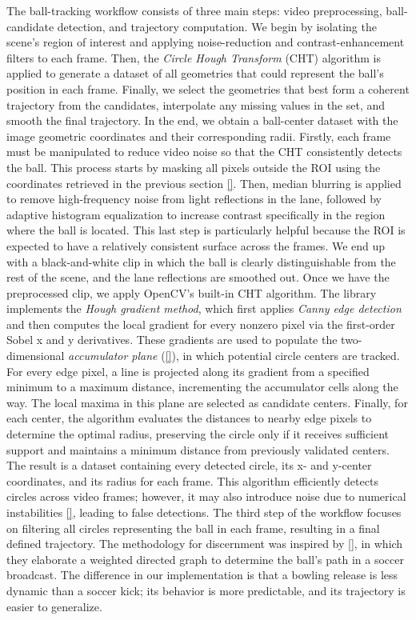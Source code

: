 The ball-tracking workflow consists of three main steps: video preprocessing, ball-candidate detection, and trajectory computation. We begin by isolating the scene’s region of interest and applying noise-reduction and contrast-enhancement filters to each frame. Then, the \emph{Circle Hough Transform} (CHT) algorithm is applied to generate a dataset of all geometries that could represent the ball’s position in each frame. Finally, we select the geometries that best form a coherent trajectory from the candidates, interpolate any missing values in the set, and smooth the final trajectory. In the end, we obtain a ball-center dataset with the image geometric coordinates and their corresponding radii.
Firstly, each frame must be manipulated to reduce video noise so that the CHT consistently detects the ball. This process starts by masking all pixels outside the ROI using the coordinates retrieved in the previous section \ref{}. Then, median blurring is applied to remove high-frequency noise from light reflections in the lane, followed by adaptive histogram equalization to increase contrast specifically in the region where the ball is located. This last step is particularly helpful because the ROI is expected to have a relatively consistent surface across the frames. We end up with a black-and-white clip in which the ball is clearly distinguishable from the rest of the scene, and the lane reflections are smoothed out.
Once we have the preprocessed clip, we apply OpenCV's built-in CHT algorithm. The library implements the \emph{Hough gradient method}, which first applies \emph{Canny edge detection} and then computes the local gradient for every nonzero pixel via the first-order Sobel x and y derivatives. These gradients are used to populate the two-dimensional \emph{accumulator plane} (\ref{}), in which potential circle centers are tracked. For every edge pixel, a line is projected along its gradient from a specified minimum to a maximum distance, incrementing the accumulator cells along the way. The local maxima in this plane are selected as candidate centers. Finally, for each center, the algorithm evaluates the distances to nearby edge pixels to determine the optimal radius, preserving the circle only if it receives sufficient support and maintains a minimum distance from previously validated centers. The result is a dataset containing every detected circle, its x- and y-center coordinates, and its radius for each frame.
This algorithm efficiently detects circles across video frames; however, it may also introduce noise due to numerical instabilities \ref{}, leading to false detections. The third step of the workflow focuses on filtering all circles representing the ball in each frame, resulting in a final defined trajectory. The methodology for discernment was inspired by \ref{}, in which they elaborate a weighted directed graph to determine the ball’s path in a soccer broadcast. The difference in our implementation is that a bowling release is less dynamic than a soccer kick; its behavior is more predictable, and its trajectory is easier to generalize. 
